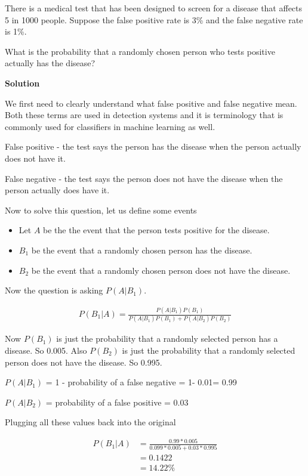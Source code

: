 \documentclass[12pt]{article}
\begin{document}
\medskip

There is a medical test that has been designed to screen for a disease that affects 5 in 1000 people. Suppose the false positive rate is 3\% and the false negative rate is 1\%. 

What is the probability that a randomly chosen person who tests positive actually has the disease?

\textbf{Solution}

We first need to clearly understand what false positive and false negative mean. Both these terms are used in detection systems and it is terminology that is commonly used for classifiers in machine learning as well.

False positive - the test says the person has the disease when the person actually does not have it.

False negative - the test says the person does not have the disease when the person actually does have it.

Now to solve this question, let us define some events

\begin{itemize}
\item Let $A$ be the the event that the person tests positive for the disease.
\item $B_1$ be the event that a randomly chosen person has the disease.
\item $B_2$ be the event that a randomly chosen person does not have the disease.
\end{itemize}

Now the question is asking $P(A|B_1)$.

\begin{align*}
P(B_1|A) = \frac{P(A|B_1)P(B_1)}{P(A|B_1)P(B_1) + P(A|B_2)P(B_2)}
\end{align*}

Now $P(B_1)$ is  just the probability that a randomly selected person has a disease. So 0.005.
Also $P(B_2)$ is just the probability that a randomly selected person does not have the disease. So 0.995.

$P(A|B_1)$ = 1 - probability of a false negative = 1- 0.01= 0.99

$P(A|B_2)$ = probability of a false positive = 0.03

Plugging all these values back into the original 

\begin{align*}
P(B_1|A) &= \frac{0.99*0.005}{0.099*0.005 + 0.03 * 0.995} \\
&= 0.1422 \\
&= 14.22\%
\end{align*} 
\end{document}

